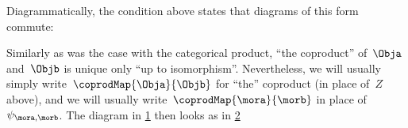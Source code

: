 \begin{remark}
  Diagrammatically, the condition above states that diagrams of this form commute:
  \begin{figure}[h!]
  \begin{center}
  \end{center}
    \caption{\label{fig:coprod_general_1}}
\end{figure}
  \label{fig:def-coproduct-diagram}
  Similarly as was the case with the categorical product, ``the coproduct'' of~$\Obja$ and~$\Objb$ is unique only ``up to isomorphism''.
  Nevertheless, we will usually simply write~$\coprodMap{\Obja}{\Objb}$ for ``the'' coproduct (in place of~$Z$ above), and we will usually write~$\coprodMap{\mora}{\morb}$ in place of~$\psi_{\mora, \morb}$.
  The diagram in \cref{fig:coprod_general_1} then looks as in \cref{fig:def-coproduct-diagram-generic}
  \begin{figure}
\begin{center}
  \end{center}
  \caption{\label{fig:def-coproduct-diagram-generic}}
\end{figure}

\end{remark}

%
%


%

